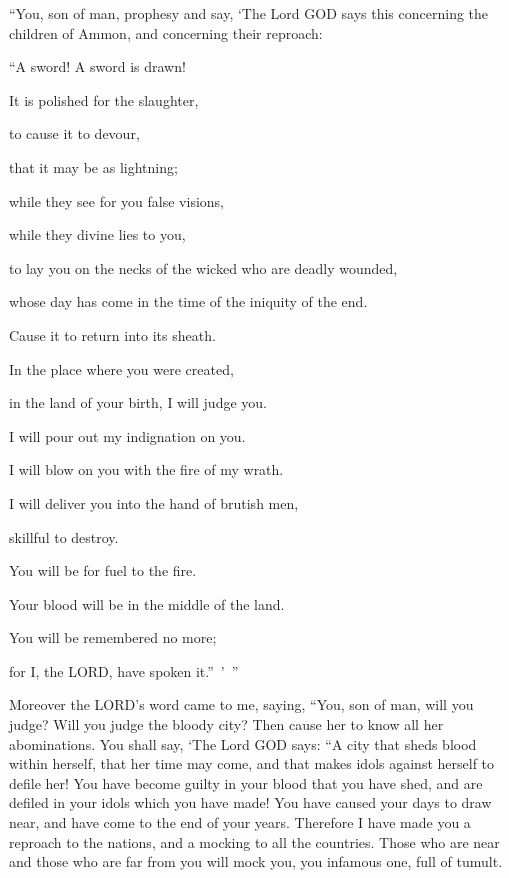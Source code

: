\myverse{}“You, son of man, prophesy and say, ‘The Lord GOD says this
concerning the children of Ammon, and concerning their reproach:

“A sword! A sword is drawn!

It is polished for the slaughter,

to cause it to devour,

that it may be as lightning;

\myverse{}while they see for you false visions,

while they divine lies to you,

to lay you on the necks of the wicked who are deadly wounded,

whose day has come in the time of the iniquity of the end.

\myverse{}Cause it to return into its sheath.

In the place where you were created,

in the land of your birth, I will judge you.

\myverse{}I will pour out my indignation on you.

I will blow on you with the fire of my wrath.

I will deliver you into the hand of brutish men,

skillful to destroy.

\myverse{}You will be for fuel to the fire.

Your blood will be in the middle of the land.

You will be remembered no more;

for I, the LORD, have spoken it.” ’ ”


\mychapter{} \myverse*{}Moreover the LORD’s word came to me, saying,
\myverse{}“You, son of man, will you judge? Will you judge the bloody city? Then cause
her to know all her abominations.
\myverse{}You shall say, ‘The Lord GOD says: “A city that sheds blood within herself,
that her time may come, and that makes idols against herself to defile her!
\myverse{}You have become guilty in your blood that you have shed, and are defiled in
your idols which you have made! You have caused your days to draw near, and have come to the end of your
years. Therefore I have made you a reproach to the nations, and a mocking to all the countries.
\myverse{}Those who are near and those who are far from you will mock you, you infamous
one, full of tumult.


